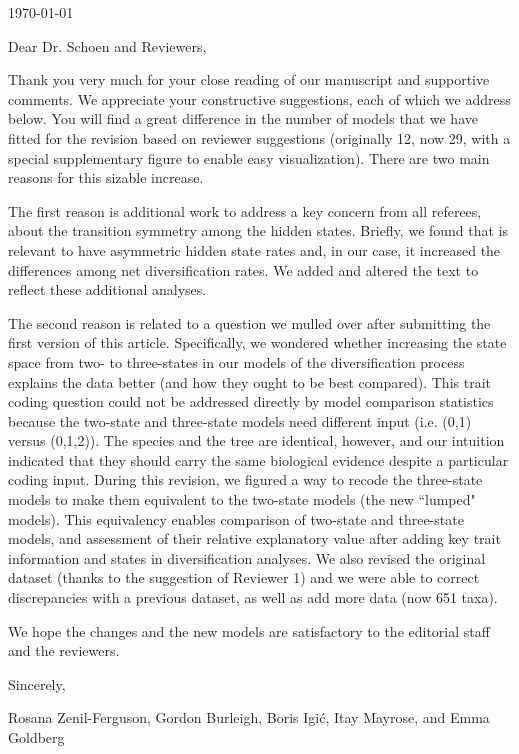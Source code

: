 \documentclass[11pt]{article}
\begin{document}
\hfill \today

Dear Dr. Schoen and Reviewers,

\medskip
Thank you very much for your close reading of our manuscript and supportive comments. We appreciate your constructive suggestions, each of which we address below. You will find a great difference in the number of models that we have fitted for the revision based on reviewer suggestions (originally 12, now 29, with a special supplementary figure to enable easy visualization). There are two main reasons for this sizable increase. 

The first reason is additional work to address a key concern from all referees, about the transition symmetry among the hidden states. 
Briefly, we found that is relevant to have asymmetric hidden state rates and, in our case, it increased the differences among net diversification rates. 
We added and altered the text to reflect these additional analyses. 


The second reason is related to a question we mulled over after submitting the first version of this article. Specifically, we wondered whether increasing the state space from two- to three-states in our models of the diversification process explains the data better (and how they ought to be best compared). 
This  trait coding question could not be addressed directly by model comparison statistics because the two-state and three-state models need different input (i.e. (0,1) versus (0,1,2)). 
The species and the tree are identical, however, and our intuition indicated that they should carry the same biological evidence despite a particular coding input. 
During this revision, we figured a way to recode the three-state models to make them equivalent to the two-state models (the new ``lumped" models). 
This equivalency enables comparison of two-state and three-state models, and assessment of their relative explanatory value after adding key trait information and states in diversification analyses. 
We also revised the original dataset (thanks to the suggestion of Reviewer 1) and we were able to correct discrepancies with a previous dataset, as well as add more data (now 651 taxa).

We hope the changes and the new models are satisfactory to the editorial staff and the reviewers.

\medskip
Sincerely,

Rosana Zenil-Ferguson, Gordon Burleigh, Boris Igi\'c, Itay Mayrose, and Emma Goldberg


\end{document}
